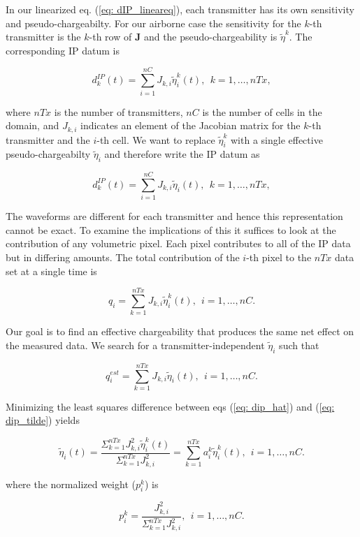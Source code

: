 \documentclass[extra,mreferee]{gji}
\newcommand{\peta}{\tilde{\eta}}
\newcommand{\dip}{d^{IP}}
\begin{document}
In our linearized eq. (\ref{eq: dIP_lineareq}), each transmitter has its own sensitivity and pseudo-chargeabilty. For our airborne case the sensitivity for the $k$-th transmitter is the $k$-th row of $\mathbf{J}$ and the pseudo-chargeability is $\peta^k$. The corresponding  IP datum is
\begin{linenomath*}
\begin{equation}
  \dip_k(t) = \sum_{i=1}^{nC}J_{k,i}\peta^k_i (t), \ \ k=1, \ldots, nTx,
  \label{eq: dip_kthTx}
\end{equation}
\end{linenomath*}
where $nTx$ is the number of transmitters, $nC$ is the number of cells in the domain, and $J_{k,i}$ indicates an element of the Jacobian matrix for the $k$-th transmitter and the $i$-th cell. We want to replace $\peta^k_i$ with a single effective pseudo-chargeabilty $\peta_i$ and therefore write the IP datum as
\begin{linenomath*}
\begin{equation}
  \dip_k(t) = \sum_{i=1}^{nC}J_{k,i}\peta_i (t), \ \ k=1, \ldots, nTx,
  \label{eq: dipeff_kthTx}
\end{equation}
\end{linenomath*}
The waveforms are different for each transmitter and hence this representation cannot be exact. To examine the implications of this it suffices to look at the contribution of any volumetric pixel. Each pixel contributes to all of the IP data but in differing amounts. The total contribution of the  $i$-th pixel to the $nTx$ data set at a single time is
\begin{linenomath*}
\begin{equation}
  q_i =\sum_{k=1}^{nTx} J_{k,i} \peta^k_i(t), \ \ i=1, \ldots, nC.
  \label{eq: dip_hat}
\end{equation}
\end{linenomath*}
Our goal is to find an effective chargeability that produces the same net effect on the measured data. We search for a transmitter-independent $\peta_i$ such that
\begin{linenomath*}
\begin{equation}
  q_i^{est} =\sum_{k=1}^{nTx} J_{k,i} \peta_i(t), \ \ i=1, \ldots, nC.
  \label{eq: dip_tilde}
\end{equation}
\end{linenomath*}
Minimizing the least squares difference between eqs (\ref{eq: dip_hat}) and (\ref{eq: dip_tilde}) yields
\begin{linenomath*}
\begin{equation}
  \peta_i(t) = \frac {\Sigma_{k=1}^{nTx} J_{k,i}^2\peta^k_i(t)} {\Sigma_{k=1}^{nTx} J_{k,i}^2} = \sum_{k=1}^{nTx} a^k_i \peta^k_i(t), \ \ i=1, \ldots, nC.
  \label{eq: petaeff}
\end{equation}
\end{linenomath*}
where the normalized weight ($p^k_i$) is
\begin{linenomath*}
\begin{equation}
  p^k_i = \frac {J^2_{k,i}} {\Sigma_{k=1}^{nTx} J^2_{k,i}}, \ \ i=1, \ldots, nC.
  \label{eq: normalized_weights}
\end{equation}
\end{linenomath*}
\end{document}

